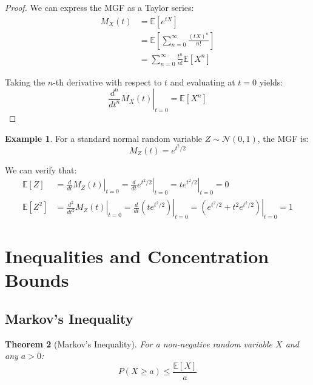 \documentclass[12pt,a4paper]{article}
\theoremstyle{plain}
\newtheorem{theorem}{Theorem}[section]
\theoremstyle{definition}
\newtheorem{example}[theorem]{Example}
\begin{document}
\begin{proof}
We can express the MGF as a Taylor series:
\begin{align*}
M_X(t) &= \mathbb{E}[e^{tX}]\\
&= \mathbb{E}\left[\sum_{n=0}^{\infty}\frac{(tX)^n}{n!}\right]\\
&= \sum_{n=0}^{\infty}\frac{t^n}{n!}\mathbb{E}[X^n]
\end{align*}

Taking the $n$-th derivative with respect to $t$ and evaluating at $t = 0$ yields:
\begin{equation*}
\left.\frac{d^n}{dt^n}M_X(t)\right|_{t=0} = \mathbb{E}[X^n]
\end{equation*}
\end{proof}

\begin{example}
For a standard normal random variable $Z \sim \mathcal{N}(0, 1)$, the MGF is:
\begin{equation*}
M_Z(t) = e^{t^2/2}
\end{equation*}

We can verify that:
\begin{align*}
\mathbb{E}[Z] &= \left.\frac{d}{dt}M_Z(t)\right|_{t=0} = \left.\frac{d}{dt}e^{t^2/2}\right|_{t=0} = \left.t e^{t^2/2}\right|_{t=0} = 0\\
\mathbb{E}[Z^2] &= \left.\frac{d^2}{dt^2}M_Z(t)\right|_{t=0} = \left.\frac{d}{dt}(t e^{t^2/2})\right|_{t=0} = \left.(e^{t^2/2} + t^2 e^{t^2/2})\right|_{t=0} = 1
\end{align*}
\end{example}

\section{Inequalities and Concentration Bounds}

\subsection{Markov's Inequality}

\begin{theorem}[Markov's Inequality]
For a non-negative random variable $X$ and any $a > 0$:
\begin{equation}
P(X \geq a) \leq \frac{\mathbb{E}[X]}{a}
\end{equation}
\end{theorem}
\end{document}

